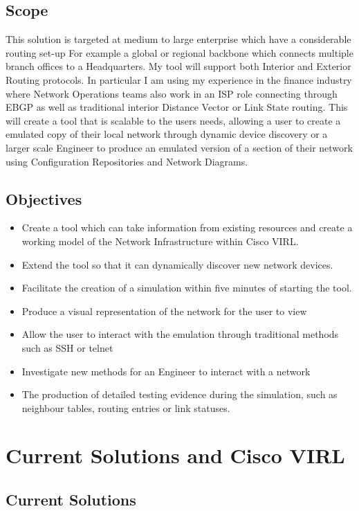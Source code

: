 \documentclass[11pt]{report}
\begin{document}
\section{Scope}

This solution is targeted at medium to large enterprise which have a considerable routing set-up For example a global or regional backbone which connects multiple branch offices to a Headquarters. My tool will support both Interior and Exterior Routing protocols. In particular I am using my experience in the finance industry where Network Operations teams also work in an ISP role connecting through EBGP as well as traditional interior Distance Vector or Link State routing. This will create a tool that is scalable to the users needs, allowing a user to create a emulated copy of their local network through dynamic device discovery or a larger scale Engineer to produce an emulated version of a section of their network using Configuration Repositories and Network Diagrams.

\section{Objectives}
\begin{itemize}
\item{Create a tool which can take information from existing resources and create a working model of the Network Infrastructure within Cisco VIRL.}
\item{Extend the tool so that it can dynamically discover new network devices.}
\item{Facilitate the creation of a simulation within five minutes of starting the tool.}
\item{Produce a visual representation of the network for the user to view}
\item{Allow the user to interact with the emulation through traditional methods such as SSH or telnet}
\item{Investigate new methods for an Engineer to interact with a network}
\item{The production of detailed testing evidence during the simulation, such as neighbour tables, routing entries or link statuses.}
\end{itemize}

\chapter{Current Solutions and Cisco VIRL}

\section{Current Solutions}
\end{document}
